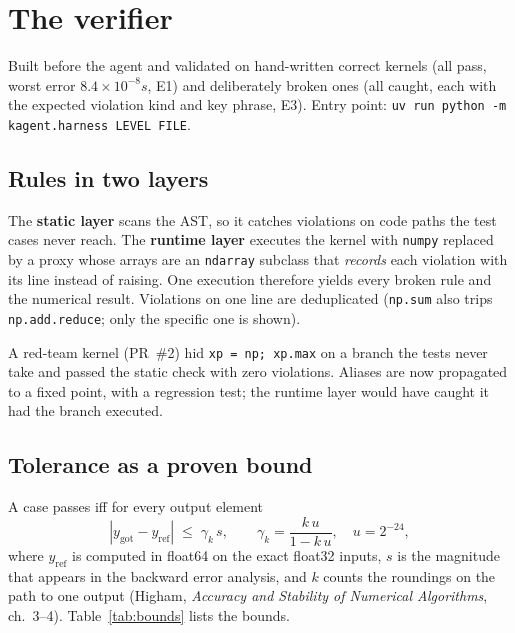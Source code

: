 \documentclass[11pt]{article}
\newcommand{\code}[1]{\texttt{#1}}
\newcommand{\E}[1]{E#1}
\begin{document}
\section{The verifier}
\label{sec:verifier}

Built before the agent and validated on hand-written correct kernels (all pass, worst error
$8.4\times10^{-8}s$, \E{1}) and deliberately broken ones (all caught, each with the expected violation kind
and key phrase, \E{3}). Entry point: \code{uv run python -m kagent.harness LEVEL FILE}.

\subsection{Rules in two layers}
The \textbf{static layer} scans the AST, so it catches violations on code paths the test cases never
reach. The \textbf{runtime layer} executes the kernel with \code{numpy} replaced by a proxy whose arrays
are an \code{ndarray} subclass that \emph{records} each violation with its line instead of raising. One
execution therefore yields every broken rule and the numerical result. Violations on one line are
deduplicated (\code{np.sum} also trips \code{np.add.reduce}; only the specific one is shown).

A red-team kernel (PR~\#2) hid \code{xp = np; xp.max} on a branch the tests never take and passed the
static check with zero violations. Aliases are now propagated to a fixed point, with a regression test;
the runtime layer would have caught it had the branch executed.

\subsection{Tolerance as a proven bound}
\label{sec:tol}
A case passes iff for every output element
\[
  |y_{\text{got}} - y_{\text{ref}}| \;\le\; \gamma_k\, s,
  \qquad \gamma_k = \frac{k\,u}{1-k\,u},\quad u = 2^{-24},
\]
where $y_{\text{ref}}$ is computed in float64 on the exact float32 inputs, $s$ is the magnitude that
appears in the backward error analysis, and $k$ counts the roundings on the path to one output
(Higham, \emph{Accuracy and Stability of Numerical Algorithms}, ch.~3--4). Table~\ref{tab:bounds}
lists the bounds.
\end{document}
